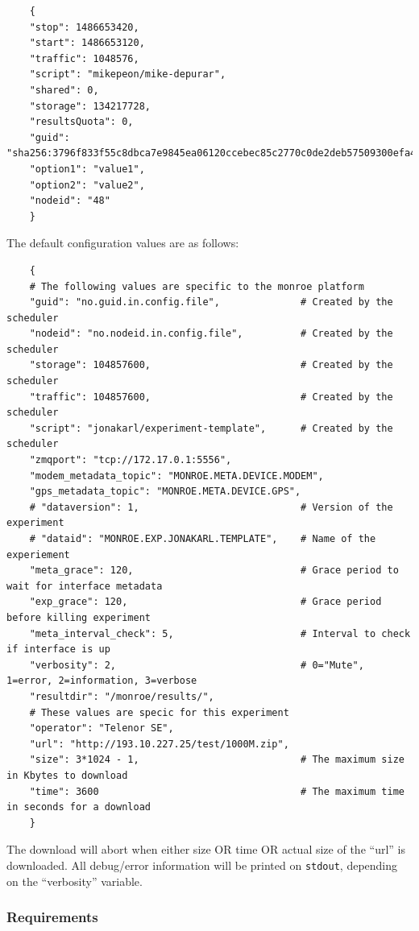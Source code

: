\documentclass[a4paper,10pt]{article}
\newcommand{\VerbatimFont}{\footnotesize}
\newcommand{\identifier}[1]{{\texttt{\small{#1}}}}
\begin{document}
{\VerbatimFont
	\begin{verbatim}
	{
	"stop": 1486653420, 
	"start": 1486653120,
	"traffic": 1048576,
	"script": "mikepeon/mike-depurar",
	"shared": 0,
	"storage": 134217728,
	"resultsQuota": 0,
	"guid": "sha256:3796f833f55c8dbca7e9845ea06120ccebec85c2770c0de2deb57509300efa44.165695.48.1",
	"option1": "value1",
	"option2": "value2",
	"nodeid": "48"
	}
	\end{verbatim}}

The default configuration values are as follows:

{\VerbatimFont
	\begin{verbatim}
	{
	# The following values are specific to the monroe platform
	"guid": "no.guid.in.config.file",              # Created by the scheduler
	"nodeid": "no.nodeid.in.config.file",          # Created by the scheduler
	"storage": 104857600,                          # Created by the scheduler
	"traffic": 104857600,                          # Created by the scheduler
	"script": "jonakarl/experiment-template",      # Created by the scheduler
	"zmqport": "tcp://172.17.0.1:5556",
	"modem_metadata_topic": "MONROE.META.DEVICE.MODEM",
	"gps_metadata_topic": "MONROE.META.DEVICE.GPS",
	# "dataversion": 1,                            # Version of the experiment
	# "dataid": "MONROE.EXP.JONAKARL.TEMPLATE",    # Name of the experiement
	"meta_grace": 120,                             # Grace period to wait for interface metadata
	"exp_grace": 120,                              # Grace period before killing experiment
	"meta_interval_check": 5,                      # Interval to check if interface is up
	"verbosity": 2,                                # 0="Mute", 1=error, 2=information, 3=verbose
	"resultdir": "/monroe/results/",
	# These values are specic for this experiment
	"operator": "Telenor SE",
	"url": "http://193.10.227.25/test/1000M.zip",
	"size": 3*1024 - 1,                            # The maximum size in Kbytes to download
	"time": 3600                                   # The maximum time in seconds for a download
	}
	\end{verbatim}}

The download will abort when either size OR time OR actual size of the ``url'' is downloaded.
All debug/error information will be printed on \identifier{stdout}, depending on the ``verbosity'' variable.

\subsubsection{Requirements}
\end{document}
